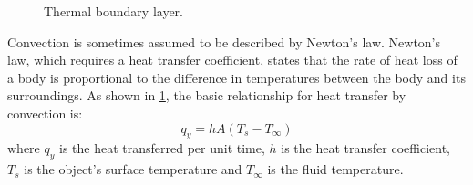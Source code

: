 \begin{figure}[!htp]
	\centering{}
	\caption{Thermal boundary layer.}
	\label{Thermal_boundary_layer}
\end{figure}

Convection is sometimes assumed to be described by Newton's law.
Newton's law, which requires a heat transfer coefficient, states that the rate of heat loss of a body is proportional to the difference in temperatures between the body and its surroundings. %
As shown in \ref{Thermal_boundary_layer}, the basic relationship for heat transfer by convection is:
    \begin{equation}
    q_y=hA(T_s-T_{\infty})
    \end{equation}
where $q_y$ is the heat transferred per unit time, $h$ is the heat transfer coefficient, $T_s$ is the object's surface temperature and $T_{\infty}$ is the fluid temperature.



